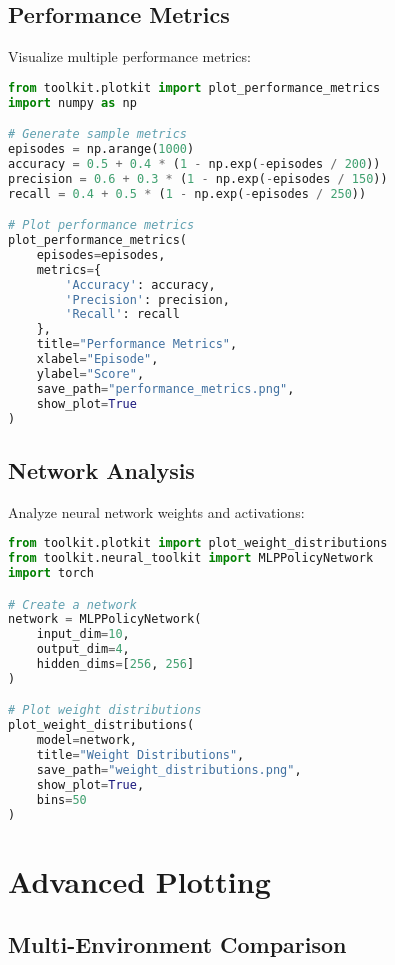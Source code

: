 \subsection{Performance Metrics}

Visualize multiple performance metrics:

\begin{lstlisting}[language=python, caption=Performance Metrics Example]
from toolkit.plotkit import plot_performance_metrics
import numpy as np

# Generate sample metrics
episodes = np.arange(1000)
accuracy = 0.5 + 0.4 * (1 - np.exp(-episodes / 200))
precision = 0.6 + 0.3 * (1 - np.exp(-episodes / 150))
recall = 0.4 + 0.5 * (1 - np.exp(-episodes / 250))

# Plot performance metrics
plot_performance_metrics(
    episodes=episodes,
    metrics={
        'Accuracy': accuracy,
        'Precision': precision,
        'Recall': recall
    },
    title="Performance Metrics",
    xlabel="Episode",
    ylabel="Score",
    save_path="performance_metrics.png",
    show_plot=True
)
\end{lstlisting}

\subsection{Network Analysis}

Analyze neural network weights and activations:

\begin{lstlisting}[language=python, caption=Network Analysis Example]
from toolkit.plotkit import plot_weight_distributions
from toolkit.neural_toolkit import MLPPolicyNetwork
import torch

# Create a network
network = MLPPolicyNetwork(
    input_dim=10,
    output_dim=4,
    hidden_dims=[256, 256]
)

# Plot weight distributions
plot_weight_distributions(
    model=network,
    title="Weight Distributions",
    save_path="weight_distributions.png",
    show_plot=True,
    bins=50
)
\end{lstlisting}

\section{Advanced Plotting}

\subsection{Multi-Environment Comparison}

